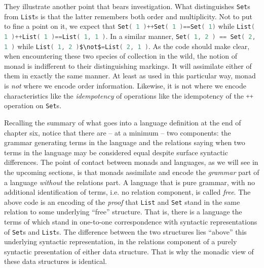 They illustrate another point that bears investigation. What
distinguishes \lstinline[language=Scala,mathescape=true]!Set!s from
\lstinline[language=Scala,mathescape=true]!List!s is that the latter
remembers both order and multiplicity. Not to put to fine a point on
it, we expect that \lstinline[language=Scala,mathescape=true]!Set( 1 )++Set( 1 )==Set( 1)! while
\lstinline[language=Scala,mathescape=true]!List( 1 )++List( 1 )==List( 1, 1 )!. In a similar manner, \lstinline[language=Scala,mathescape=true]!Set( 1, 2 ) == Set( 2, 1 )! while \lstinline[language=Scala,mathescape=true]!List( 1, 2 )$\not$=List( 2, 1 )!. As the code should make clear, when encountering these two species of collection in the wild, the notion of monad is indifferent to their distinguishing markings. It will assimilate either of them in exactly the same manner. At least as used in this particular way, monad is \emph{not} where we encode order information. Likewise, it is not where we encode characteristics like the \emph{idempotency} of operations like the idempotency of the \lstinline[language=Scala,mathescape=true]!++! operation on \lstinline[language=Scala,mathescape=true]!Set!s.

Recalling the summary of what goes into a language definition at the
end of chapter six, notice that there are -- at a minimum -- two
components: the grammar generating terms in the language and the
relations saying when two terms in the language may be considered
equal despite surface syntactic differences. The point of contact
between monads and languages, as we will see in the upcoming sections,
is that monads assimilate and encode the \emph{grammar} part of a
language \emph{without} the relations part. A language that is pure
grammar, with no additional identification of terms, i.e. no relation
component, is called \emph{free}. The above code is an encoding of the
\emph{proof} that \lstinline[language=Scala,mathescape=true]!List! and
\lstinline[language=Scala,mathescape=true]!Set! stand in the same
relation to some underlying ``free'' structure. That is, there is a
language the terms of which stand in one-to-one correspondence with
syntactic representations of
\lstinline[language=Scala,mathescape=true]!Set!s and
\lstinline[language=Scala,mathescape=true]!List!s. The difference
between the two structures lies ``above'' this underlying syntactic
representation, in the relations component of a purely syntactic
presentation of either data structure. That is why the monadic view of
these data structures is identical.

